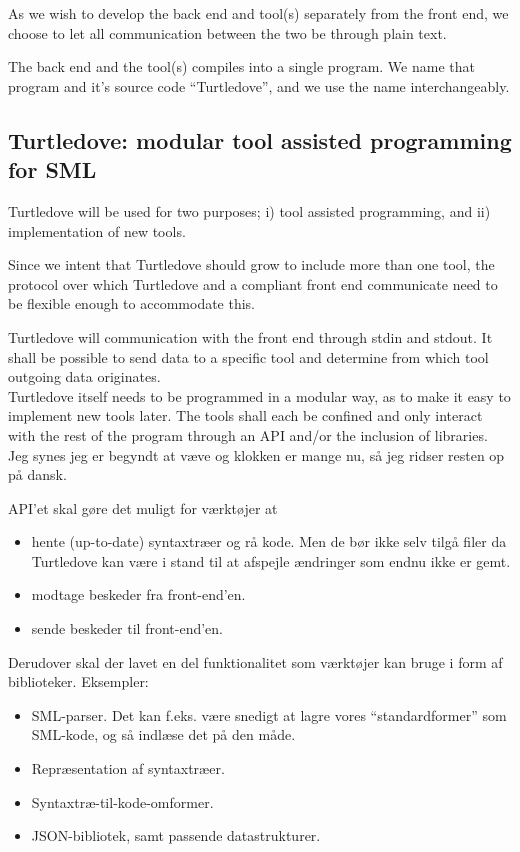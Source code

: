 \documentclass[a4paper,11pt,fleqn]{article}
\begin{document}
As we wish to develop the back end and tool(s) separately from the front end, we choose to let all
communication between the two be through plain text.

The back end and the tool(s) compiles into a single program. We name that program and it's source
code ``Turtledove'', and we use the name interchangeably.

\subsection{Turtledove: modular tool assisted programming for SML} 
Turtledove will be used for two purposes; i) tool assisted programming, and ii) implementation of
new tools.

Since we intent that Turtledove should grow to include more than one tool, the protocol over which
Turtledove and a compliant front end communicate need to be flexible enough to accommodate this.

Turtledove will communication with the front end through stdin and stdout. It shall be possible to
send data to a specific tool and determine from which tool outgoing data originates.
\\

Turtledove itself needs to be programmed in a modular way, as to make it easy to implement new tools
later. The tools shall each be confined and only interact with the rest of the program through an
API and/or the inclusion of libraries.
\\

Jeg synes jeg er begyndt at væve og klokken er mange nu, så jeg ridser resten op på dansk.

API'et skal gøre det muligt for værktøjer at
\begin{itemize}
\item hente (up-to-date) syntaxtræer og rå kode. Men de bør ikke selv tilgå filer da Turtledove kan
      være i stand til at afspejle ændringer som endnu ikke er gemt.
\item modtage beskeder fra front-end'en.
\item sende beskeder til front-end'en.
\end{itemize}

Derudover skal der lavet en del funktionalitet som værktøjer kan bruge i form af
biblioteker. Eksempler:
\begin{itemize}
\item SML-parser. Det kan f.eks. være snedigt at lagre vores ``standardformer'' som SML-kode, og så
      indlæse det på den måde.
\item Repræsentation af syntaxtræer.
\item Syntaxtræ-til-kode-omformer.
\item JSON-bibliotek, samt passende datastrukturer.
\end{itemize}
\end{document}
